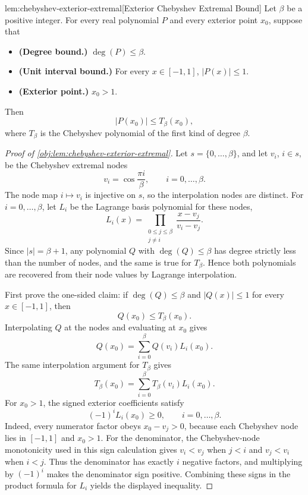 \documentclass[11pt]{article}
\begin{document}
\begin{lemmav}{lem:chebyshev-exterior-extremal}[Exterior Chebyshev Extremal Bound]
Let $\beta$ be a positive integer. For every real polynomial $P$ and every exterior point $x_0$, suppose that
\begin{itemize}
\item \textbf{(Degree bound.)} $\deg(P)\le \beta$.
\item \textbf{(Unit interval bound.)} For every $x\in[-1,1]$, $|P(x)|\le 1$.
\item \textbf{(Exterior point.)} $x_0>1$.
\end{itemize}
Then
\[
|P(x_0)|\le T_\beta(x_0),
\]
where $T_\beta$ is the Chebyshev polynomial of the first kind of degree $\beta$.
\end{lemmav}

\begin{proof}[Proof of \cref{obj:lem:chebyshev-exterior-extremal}]
Let \(s=\{0,\ldots,\beta\}\), and let \(v_i\), \(i\in s\), be the Chebyshev extremal nodes
\[
v_i=\cos\frac{\pi i}{\beta},
\qquad i=0,\ldots,\beta .
\]
The node map \(i\mapsto v_i\) is injective on \(s\), so the interpolation nodes are distinct. %
For \(i=0,\ldots,\beta\), let \(L_i\) be the Lagrange basis polynomial for these nodes,
\[
L_i(x)=\prod_{\substack{0\le j\le\beta\\ j\ne i}}\frac{x-v_j}{v_i-v_j}.
\]
Since \(|s|=\beta+1\), any polynomial \(Q\) with \(\deg(Q)\le\beta\) has degree strictly less than the number of nodes, and the same is true for \(T_\beta\). Hence both polynomials are recovered from their node values by Lagrange interpolation.

First prove the one-sided claim: if \(\deg(Q)\le\beta\) and \(|Q(x)|\le1\) for every \(x\in[-1,1]\), then
\[
Q(x_0)\le T_\beta(x_0).
\]
Interpolating \(Q\) at the nodes and evaluating at \(x_0\) gives
\[
Q(x_0)=\sum_{i=0}^{\beta}Q(v_i)L_i(x_0).
\] %
The same interpolation argument for \(T_\beta\) gives
\[
T_\beta(x_0)=\sum_{i=0}^{\beta}T_\beta(v_i)L_i(x_0).
\] %
For \(x_0>1\), the signed exterior coefficients satisfy
\[
(-1)^iL_i(x_0)\ge0,
\qquad i=0,\ldots,\beta .
\]
Indeed, every numerator factor obeys \(x_0-v_j>0\), because each Chebyshev node lies in \([-1,1]\) and \(x_0>1\). For the denominator, the Chebyshev-node monotonicity used in this sign calculation gives \(v_i<v_j\) when \(j<i\) and \(v_j<v_i\) when \(i<j\). Thus the denominator has exactly \(i\) negative factors, and multiplying by \((-1)^i\) makes the denominator sign positive. Combining these signs in the product formula for \(L_i\) yields the displayed inequality. %


\end{proof}
\end{document}
